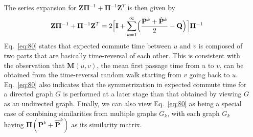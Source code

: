The series expansion for $\mathbf{Z}\bm{\Pi}^{-1} +
\bm{\Pi}^{-1}\mathbf{Z}^{T}$ is then given by
\begin{equation}
  \label{eq:80}
  \mathbf{Z}\bm{\Pi}^{-1} + \bm{\Pi}^{-1}\mathbf{Z}^{T} = 
 2 \Bigl[ \mathbf{I} +
  \sum_{k=1}^{\infty}\Bigl(\frac{\mathbf{P}^{k} + \hat{\mathbf{P}}^{k}}{2}
  - \mathbf{Q}\Bigr)\Bigr] \bm{\Pi}^{-1}
\end{equation}
Eq.~\eqref{eq:80} states that expected commute time between $u$ and
$v$ is composed of two parts that are basically time-reversal of each
other. This is consistent with the observation that $\mathbf{M}(u,v)$,
the mean first passage time from $u$ to $v$, can be obtained from the
time-reversal random walk starting from $v$ going back to
$u$. Eq.~\eqref{eq:80} also indicates that the symmetrization in
expected commute time for a directed graph $G$ is performed at a later
stage than that obtained by viewing $G$ as an undirected
graph. Finally, we can also view Eq.~\eqref{eq:80} as being a special
case of combining similarities from multiple graphs $G_k$, with each
graph $G_k$ having $\bm{\Pi}(\mathbf{P}^{k} + \hat{\mathbf{P}}^{k})$
as its similarity matrix.
